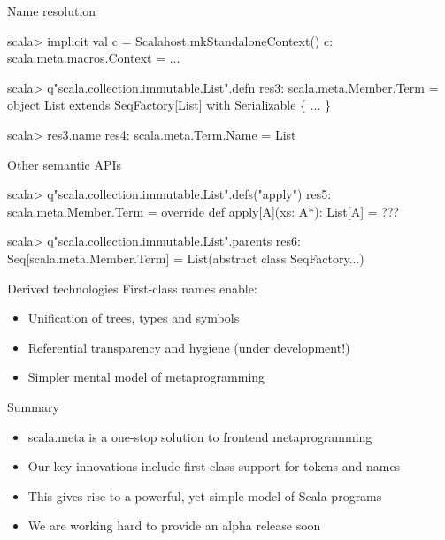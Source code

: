 \documentclass[svgnames,dvipsnames,hyperref={bookmarks=false},usepdftitle=false]{beamer}
\begin{document}
\begin{frame}[fragile]{Name resolution}
\begin{semiverbatim}
scala> implicit val c = Scalahost.mkStandaloneContext()
c: scala.meta.macros.Context = ...

scala> q"scala.collection.immutable.List".defn
res3: scala.meta.Member.Term = object List extends
SeqFactory[List] with Serializable \{ ... \}

scala> res3.name
res4: scala.meta.Term.Name = List
\end{semiverbatim}
\end{frame}

\begin{frame}[fragile]{Other semantic APIs}
\begin{semiverbatim}
scala> q"scala.collection.immutable.List".defs("apply")
res5: scala.meta.Member.Term =
override def apply[A](xs: A*): List[A] = ???

scala> q"scala.collection.immutable.List".parents
res6: Seq[scala.meta.Member.Term] =
List(abstract class SeqFactory...)
\end{semiverbatim}
\end{frame}

\begin{frame}{Derived technologies}
First-class names enable:
\begin{itemize}
\item Unification of trees, types and symbols
\item Referential transparency and hygiene (under development!)
\item Simpler mental model of metaprogramming
\end{itemize}
\end{frame}


\begin{frame}{Summary}
\vskip45pt
\begin{itemize}
\item scala.meta is a one-stop solution to frontend metaprogramming
\item Our key innovations include first-class support for tokens and names
\item This gives rise to a powerful, yet simple model of Scala programs
\item We are working hard to provide an alpha release soon
\end{itemize}
\vskip25pt
\end{frame}
\end{document}
